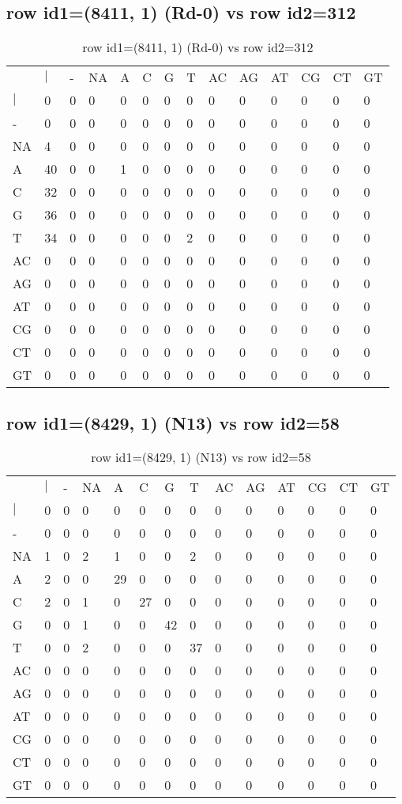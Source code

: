 \subsection{row id1=(8411, 1) (Rd-0) vs row id2=312}
\begin{center}
\begin{longtable}{|l|l|l|l|l|l|l|l|l|l|l|l|l|l|}
\caption{row id1=(8411, 1) (Rd-0) vs row id2=312} \label{table_dm678}\\
\hline
\\
\hline
&$|$&-&NA&A&C&G&T&AC&AG&AT&CG&CT&GT\\
$|$&0&0&0&0&0&0&0&0&0&0&0&0&0\\
-&0&0&0&0&0&0&0&0&0&0&0&0&0\\
NA&4&0&0&0&0&0&0&0&0&0&0&0&0\\
A&40&0&0&1&0&0&0&0&0&0&0&0&0\\
C&32&0&0&0&0&0&0&0&0&0&0&0&0\\
G&36&0&0&0&0&0&0&0&0&0&0&0&0\\
T&34&0&0&0&0&0&2&0&0&0&0&0&0\\
AC&0&0&0&0&0&0&0&0&0&0&0&0&0\\
AG&0&0&0&0&0&0&0&0&0&0&0&0&0\\
AT&0&0&0&0&0&0&0&0&0&0&0&0&0\\
CG&0&0&0&0&0&0&0&0&0&0&0&0&0\\
CT&0&0&0&0&0&0&0&0&0&0&0&0&0\\
GT&0&0&0&0&0&0&0&0&0&0&0&0&0\\
\hline
\end{longtable}
\end{center}

\subsection{row id1=(8429, 1) (N13) vs row id2=58}
\begin{center}
\begin{longtable}{|l|l|l|l|l|l|l|l|l|l|l|l|l|l|}
\caption{row id1=(8429, 1) (N13) vs row id2=58} \label{table_dm680}\\
\hline
\\
\hline
&$|$&-&NA&A&C&G&T&AC&AG&AT&CG&CT&GT\\
$|$&0&0&0&0&0&0&0&0&0&0&0&0&0\\
-&0&0&0&0&0&0&0&0&0&0&0&0&0\\
NA&1&0&2&1&0&0&2&0&0&0&0&0&0\\
A&2&0&0&29&0&0&0&0&0&0&0&0&0\\
C&2&0&1&0&27&0&0&0&0&0&0&0&0\\
G&0&0&1&0&0&42&0&0&0&0&0&0&0\\
T&0&0&2&0&0&0&37&0&0&0&0&0&0\\
AC&0&0&0&0&0&0&0&0&0&0&0&0&0\\
AG&0&0&0&0&0&0&0&0&0&0&0&0&0\\
AT&0&0&0&0&0&0&0&0&0&0&0&0&0\\
CG&0&0&0&0&0&0&0&0&0&0&0&0&0\\
CT&0&0&0&0&0&0&0&0&0&0&0&0&0\\
GT&0&0&0&0&0&0&0&0&0&0&0&0&0\\
\hline
\end{longtable}
\end{center}

